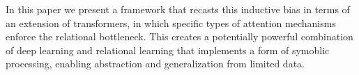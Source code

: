 In this paper we present a framework that recasts this inductive bias in terms of an extension of transformers, in
which specific types of attention mechanisms enforce the relational bottleneck. This creates a potentially powerful
combination of deep learning and relational learning that implements a form of symoblic processing, enabling
abstraction and generalization from limited data.

